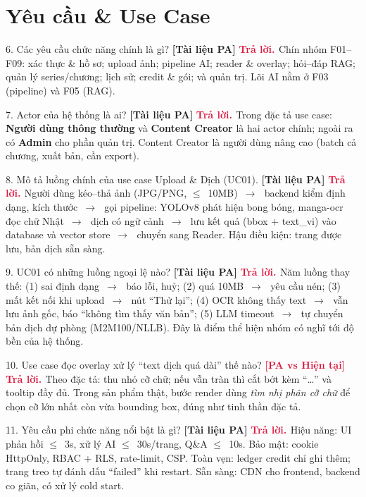 \documentclass[11pt]{article}
\newcommand{\arr}{\,\ensuremath{\rightarrow}\,}
\newcommand{\lte}{\ensuremath{\leq}}
\newcommand{\tagPA}{\textcolor{steel}{\footnotesize\textbf{[Tài liệu PA]}}}
\newcommand{\tagBoth}{\textcolor{crimson}{\footnotesize\textbf{[PA vs Hiện tại]}}}
\newcommand{\A}{\textbf{\textcolor{crimson}{Trả lời. }}}
\begin{document}
\section{Yêu cầu \& Use Case}

\begin{qa}{6. Các yêu cầu chức năng chính là gì? \tagPA}
\A Chín nhóm F01--F09: xác thực \& hồ sơ; upload ảnh; pipeline AI; reader \& overlay; hỏi--đáp RAG; quản lý series/chương; lịch sử; credit \& gói; và quản trị. Lõi AI nằm ở F03 (pipeline) và F05 (RAG).
\end{qa}

\begin{qa}{7. Actor của hệ thống là ai? \tagPA}
\A Trong đặc tả use case: \textbf{Người dùng thông thường} và \textbf{Content Creator} là hai actor chính; ngoài ra có \textbf{Admin} cho phần quản trị. Content Creator là người dùng nâng cao (batch cả chương, xuất bản, cần export).
\end{qa}

\begin{qa}{8. Mô tả luồng chính của use case Upload \& Dịch (UC01). \tagPA}
\A Người dùng kéo--thả ảnh (JPG/PNG, \lte\ 10MB) \arr\ backend kiểm định dạng, kích thước \arr\ gọi pipeline: YOLOv8 phát hiện bong bóng, manga-ocr đọc chữ Nhật \arr\ dịch có ngữ cảnh \arr\ lưu kết quả (bbox + text\_vi) vào database và vector store \arr\ chuyển sang Reader. Hậu điều kiện: trang được lưu, bản dịch sẵn sàng.
\end{qa}

\begin{qa}{9. UC01 có những luồng ngoại lệ nào? \tagPA}
\A Năm luồng thay thế: (1) sai định dạng \arr\ báo lỗi, huỷ; (2) quá 10MB \arr\ yêu cầu nén; (3) mất kết nối khi upload \arr\ nút ``Thử lại''; (4) OCR không thấy text \arr\ vẫn lưu ảnh gốc, báo ``không tìm thấy văn bản''; (5) LLM timeout \arr\ tự chuyển bản dịch dự phòng (M2M100/NLLB). Đây là điểm thể hiện nhóm có nghĩ tới độ bền của hệ thống.
\end{qa}

\begin{qa}{10. Use case đọc overlay xử lý ``text dịch quá dài'' thế nào? \tagBoth}
\A Theo đặc tả: thu nhỏ cỡ chữ; nếu vẫn tràn thì cắt bớt kèm ``\ldots'' và tooltip đầy đủ. Trong sản phẩm thật, bước render dùng \textit{tìm nhị phân cỡ chữ} để chọn cỡ lớn nhất còn vừa bounding box, đúng như tinh thần đặc tả.
\end{qa}

\begin{qa}{11. Yêu cầu phi chức năng nổi bật là gì? \tagPA}
\A Hiệu năng: UI phản hồi \lte\ 3s, xử lý AI \lte\ 30s/trang, Q\&A \lte\ 10s. Bảo mật: cookie HttpOnly, RBAC + RLS, rate-limit, CSP. Toàn vẹn: ledger credit chỉ ghi thêm; trang treo tự đánh dấu ``failed'' khi restart. Sẵn sàng: CDN cho frontend, backend co giãn, có xử lý cold start.
\end{qa}
\end{document}
